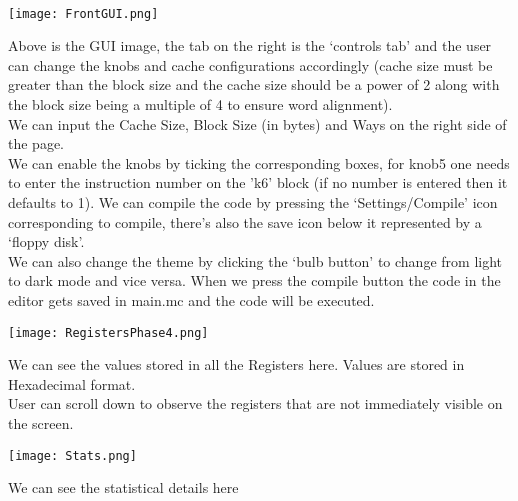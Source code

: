 \documentclass{article}
\begin{document}
\noindent
\newpage

\begin{Huge}
\\
\end{Huge}
\vspace{2cm}
\begin{centering}
\texttt{[image: FrontGUI.png]}\vspace{2cm}
\end{centering}
Above is the GUI image, the tab on the right is the `controls tab' and the user can change the knobs and cache configurations accordingly (cache size must be greater than the block size and the cache size should be a power of 2  along with the block size being a multiple of 4 to ensure word alignment).\\
\unindent
We can input the Cache Size, Block Size (in bytes) and Ways on the right side of the page.\\
We can enable the knobs by ticking the corresponding boxes, for knob5 one needs to enter the instruction number on the 'k6' block (if no number is entered then it defaults to 1).
We can compile the code by pressing the `Settings/Compile' icon corresponding to compile, there's also the save icon below it represented by a `floppy disk'.\\
We can also change the theme by clicking the `bulb button' to change from light to dark mode and vice versa.
\unindent
When we press the compile button the code in the editor gets saved in main.mc and the code will be executed.
\newpage
\begin{centering}
\texttt{[image: RegistersPhase4.png]}\vspace{2cm}
\end{centering}
We can see the values stored in all the Registers here. Values are stored in Hexadecimal format.\\
User can scroll down to observe the registers that are not immediately visible on the screen.





\newpage

\vspace{2cm}
\begin{centering}
\texttt{[image: Stats.png]}\vspace{2cm}
\end{centering}
We can see the statistical details here\\
\end{document}
